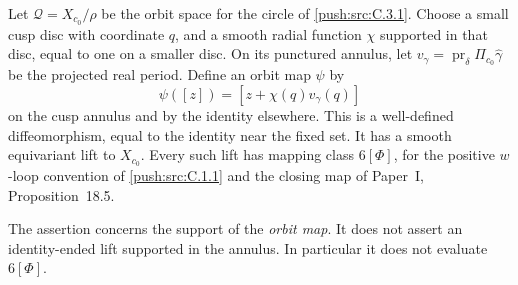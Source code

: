 \begin{proposition}\label{push:src:C.3.10}
Let $\mathcal Q=X_{c_0}/\rho$ be the orbit space for the circle of
\ref{push:src:C.3.1}. Choose a small cusp disc with coordinate $q$, and a smooth
radial function $\chi$ supported in that disc, equal to one on a
smaller disc. On its punctured annulus, let
$v_\gamma=\operatorname{pr}_{\delta}\Pi_{c_0}\widehat\gamma$
be the projected real period. Define an orbit map $\psi$ by
\[
 \psi([z])=[z+\chi(q)v_\gamma(q)]
\]
on the cusp annulus and by the identity elsewhere. This is a
well-defined diffeomorphism, equal to the identity near the fixed
set. It has a smooth equivariant lift to $X_{c_0}$. Every such lift
has mapping class $6[\Phi]$, for the positive $w$-loop convention
of \ref{push:src:C.1.1} and the closing map of Paper~I, Proposition~18.5.

The assertion concerns the support of the \emph{orbit map}.
It does not assert an identity-ended lift supported in the annulus.
In particular it does not evaluate $6[\Phi]$.
\end{proposition}
